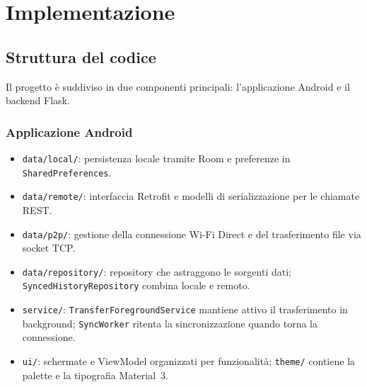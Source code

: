 \section{Implementazione}
\label{sec:implementazione}

\subsection{Struttura del codice}

Il progetto è suddiviso in due componenti principali: l'applicazione Android e il backend Flask.

\subsubsection*{Applicazione Android}

\noindent\begin{minipage}{\textwidth}
\end{minipage}

\begin{itemize}[label={--}, leftmargin=1.2cm]
    \item \texttt{data/local/}: persistenza locale tramite Room e preferenze in \texttt{Shared\-Preferences}.
    \item \texttt{data/remote/}: interfaccia Retrofit e modelli di serializzazione per le chiamate REST.
    \item \texttt{data/p2p/}: gestione della connessione Wi-Fi Direct e del trasferimento file via socket TCP.
    \item \texttt{data/repository/}: repository che astraggono le sorgenti dati; \texttt{Synced\-His\-to\-ry\-Re\-po\-si\-to\-ry} combina locale e remoto.
    \item \texttt{service/}: \texttt{TransferForegroundService} mantiene attivo il trasferimento in background; \texttt{SyncWorker} ritenta la sincronizzazione quando torna la connessione.
    \item \texttt{ui/}: schermate e ViewModel organizzati per funzionalità; \texttt{theme/} contiene la palette e la tipografia Material~3.
\end{itemize}

